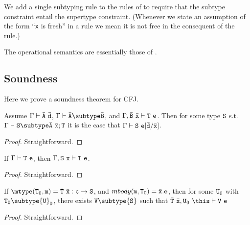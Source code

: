 We add a single subtyping rule to the rules of \FJ{} to require
that the subtype constraint entail the supertype constraint.
(Whenever we state an assumption of the form ``{\tt x} is
fresh'' in a rule we mean it is not free in the consequent of the
rule.)

The operational semantics are essentially those of \FJ{}.

\subsection{Soundness}

Here we prove a soundness theorem for CFJ.  

\begin{lemma}
\label{substitution}
Assume $\Gamma \vdash \bar{\tt A}\ \bar{\tt d}$, $\Gamma \vdash \bar{\tt A}\subtype \bar{\tt B}$, and $\Gamma, \bar{\tt B}\ \bar{\tt x} \vdash {\tt T}\ {\tt e}$. Then for some type ${\tt S}$ s.t. $\Gamma \vdash {\tt S} \subtype \bar{\tt A}\ \bar{\tt x};{\tt T}$ it is the case that $\Gamma \vdash {\tt S}\ {\tt e}[\bar{\tt d}/\bar{\tt x}]$.
\end{lemma}

\begin{proof}
Straightforward.
\end{proof}

\begin{lemma}[Weakening]
\label{weakening}
If $\Gamma \vdash {\tt T}\ {\tt e}$, then $\Gamma, {\tt S}\ {\tt x}\vdash {\tt T}\ {\tt e}$.
\end{lemma}

\begin{proof}
Straightforward.
\end{proof}

\begin{lemma}
\label{body-type}
If $\mtype({\tt T}_0,{\tt m})=\bar{\tt T}\ \bar{\tt x} : {\tt c}
\rightarrow {\tt S}$, and $mbody({\tt m}, {\tt T}_0)=\bar{\tt x}.{\tt
e}$, then for some ${\tt U}_0$ with ${\tt T}_0 \subtype {\tt U}_0$,
there exists ${\tt V}\subtype {\tt S}$ such that
$\bar{\tt T}\ \bar{\tt x},{\tt U}_0\ \this \vdash {\tt V}\ {\tt e}$
\end{lemma}

\begin{proof}
Straightforward.
\end{proof}

